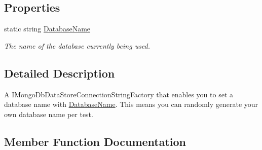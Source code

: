 \subsection*{Properties}
\begin{DoxyCompactItemize}
\item 
static string \hyperlink{classCqrs_1_1MongoDB_1_1Tests_1_1Integration_1_1TestMongoDataStoreConnectionStringFactory_a2d26a00fd14aad6718b48d515ac30ff9_a2d26a00fd14aad6718b48d515ac30ff9}{Database\+Name}
\begin{DoxyCompactList}\small\item\em The name of the database currently being used. \end{DoxyCompactList}\end{DoxyCompactItemize}


\subsection{Detailed Description}
A I\+Mongo\+Db\+Data\+Store\+Connection\+String\+Factory that enables you to set a database name with \hyperlink{classCqrs_1_1MongoDB_1_1Tests_1_1Integration_1_1TestMongoDataStoreConnectionStringFactory_a2d26a00fd14aad6718b48d515ac30ff9_a2d26a00fd14aad6718b48d515ac30ff9}{Database\+Name}. This means you can randomly generate your own database name per test. 



\subsection{Member Function Documentation}
\mbox{\label{classCqrs_1_1MongoDB_1_1Tests_1_1Integration_1_1TestMongoDataStoreConnectionStringFactory_a520a0722aa91ed6144e4e86213ea13da_a520a0722aa91ed6144e4e86213ea13da}} 

